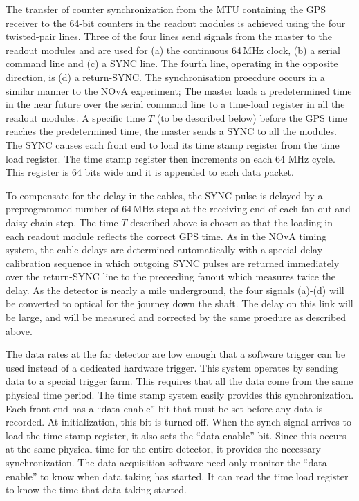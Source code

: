 The transfer of counter synchronization from the MTU containing the
GPS receiver to the 64-bit counters in the readout modules is achieved
using the four twisted-pair lines.  Three of the four lines send
signals from the master to the readout modules and are used for (a)
the continuous 64\,MHz clock, (b) a serial command line and (c) a SYNC
line. The fourth line, operating in the opposite direction, is (d) a
return-SYNC.  The synchronisation proecdure occurs in a similar manner
to the NOvA experiment; The master loads a predetermined time in the
near future over the serial command line to a time-load register in
all the readout modules.  A specific time $T$ (to be described below)
before the GPS time reaches the predetermined time, the master sends a
SYNC to all the modules.  The SYNC causes each front end to load its
time stamp register from the time load register.  The time stamp
register then increments on each 64 MHz cycle.  This register is 64
bits wide and it is appended to each data packet.

To compensate for the delay in the cables, the SYNC pulse is delayed
by a preprogrammed number of 64\,MHz steps at the receiving end of
each fan-out and daisy chain step.  The time $T$ described above is
chosen so that the loading in each readout module reflects the correct
GPS time.  As in the NOvA timing system, the cable delays are
determined automatically with a special delay-calibration sequence in
which outgoing SYNC pulses are returned immediately over the
return-SYNC line to the preceeding fanout which measures twice the
delay.  As the detector is nearly a mile underground, the four signals
(a)-(d) will be converted to optical for the journey down the shaft.
The delay on this link will be large, and will be measured and
corrected by the same proedure as described above.

The data rates at the far detector are low enough that a software
trigger can be used instead of a dedicated hardware trigger.  This
system operates by sending data to a special trigger farm.  This
requires that all the data come from the same physical time period.
The time stamp system easily provides this synchronization.  Each
front end has a ``data enable'' bit that must be set before any data is
recorded.  At initialization, this bit is turned off.  When the synch
signal arrives to load the time stamp register, it also sets the ``data
enable'' bit.  Since this occurs at the same physical time for the
entire detector, it provides the necessary synchronization.  The data
acquisition software need only monitor the ``data enable'' to know when
data taking has started.  It can read the time load register to know
the time that data taking started.

